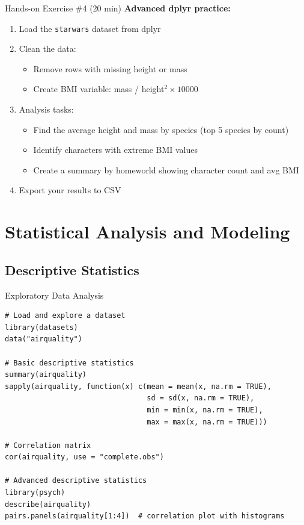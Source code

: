 \documentclass[aspectratio=169]{beamer}
\begin{document}
\begin{frame}{Hands-on Exercise \#4 (20 min)}
  \textbf{Advanced dplyr practice:}
  \begin{enumerate}
    \item Load the \texttt{starwars} dataset from dplyr
    \item Clean the data:
      \begin{itemize}
        \item Remove rows with missing height or mass
        \item Create BMI variable: mass / height$^2 \times 10000$
      \end{itemize}
    \item Analysis tasks:
      \begin{itemize}
        \item Find the average height and mass by species (top 5 species by count)
        \item Identify characters with extreme BMI values
        \item Create a summary by homeworld showing character count and avg BMI
      \end{itemize}
    \item Export your results to CSV
  \end{enumerate}
\end{frame}

\section{Statistical Analysis and Modeling}

\subsection{Descriptive Statistics}

\begin{frame}[fragile]{Exploratory Data Analysis}
\begin{lstlisting}
# Load and explore a dataset
library(datasets)
data("airquality")

# Basic descriptive statistics
summary(airquality)
sapply(airquality, function(x) c(mean = mean(x, na.rm = TRUE),
                                 sd = sd(x, na.rm = TRUE),
                                 min = min(x, na.rm = TRUE),
                                 max = max(x, na.rm = TRUE)))

# Correlation matrix
cor(airquality, use = "complete.obs")

# Advanced descriptive statistics
library(psych)
describe(airquality)
pairs.panels(airquality[1:4])  # correlation plot with histograms
\end{lstlisting}
\end{frame}
\end{document}
